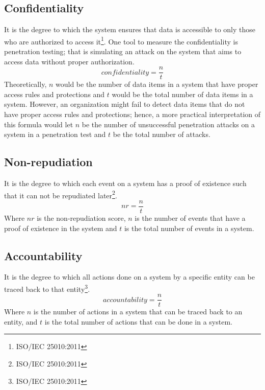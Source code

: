 \documentclass[11pt,a4paper]{article}
\def \iso{\footnote{ISO/IEC 25010:2011}}
\begin{document}
\subsection{Confidentiality}
It is the degree to which the system ensures that data is accessible to only those who are authorized to access it\iso.
One tool to measure the confidentiality is penetration testing;
that is simulating an attack on the system that aims to access data without proper authorization.
\[confidentiality = \frac{n}{t}\]
Theoretically, $n$ would be the number of data items in a system that have proper access rules and protections
and $t$ would be the total number of data items in a system.
However, an organization might fail to detect data items that do not have proper access rules and protections;
hence, a more practical interpretation of this formula would let
$n$ be the number of unsuccessful penetration attacks on a system in a penetration test
and $t$ be the total number of attacks.

\subsection{Non-repudiation}
It is the degree to which each event on a system has a proof of existence such that it can not be repudiated later\iso.
\[nr = \frac{n}{t}\]
Where $nr$ is the non-repudiation score, $n$ is the number of events that have a proof of existence in the system
and $t$ is the total number of events in a system.

\subsection{Accountability}
It is the degree to which all actions done on a system by a specific entity can be traced back to that entity\iso.
\[accountability = \frac{n}{t}\]
Where $n$ is the number of actions in a system that can be traced back to an entity,
and $t$ is the total number of actions that can be done in a system.
\end{document}
